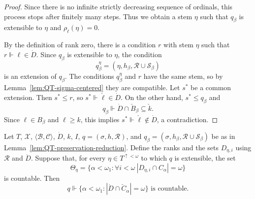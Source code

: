 \begin{proof}
Since there is no infinite strictly decreasing sequence of ordinals, this
process stops after finitely many steps.  Thus we obtain a stem $\eta$ such
that $q_\beta$ is extensible to $\eta$ and $\rho_\ell(\eta)=0$.

By the definition of rank zero, there is a condition $r$ with stem $\eta$ such
that $r\Vdash \ell\in\dot D$.
Since $q_\beta$ is extensible to $\eta$, the condition
\[
  q_\beta^\eta=(\eta,h_\beta,\mathcal R\cup\mathcal S_\beta)
\]
is an extension of $q_\beta$.  The conditions $q_\beta^\eta$ and $r$ have the
same stem, so by Lemma~\ref{lem:QT-sigma-centered} they are compatible.  Let
$s^*$ be a common extension.  Then $s^*\leq r$, so $s^*\Vdash \check \ell\in\dot D$.
On the other hand, $s^*\leq q_\beta$ and
\[
  q_\beta\Vdash \dot D\cap \check B_\beta\subseteq \check k.
\]
Since $\ell\in B_\beta$ and $\ell\geq k$, this implies $s^*\Vdash \check \ell\notin\dot D$, a contradiction.
\end{proof}

\begin{lemma}\label{lem:QT-case-two-forces-finite}
Let $T$, $\mathcal X$, $\langle\mathcal B,\mathcal C\rangle$, $\dot D$,
$k$, $I$, $q=(\sigma,h,\mathcal R)$, and
$q_\beta=(\sigma,h_\beta,\mathcal R\cup\mathcal S_\beta)$ be as in
Lemma~\ref{lem:QT-preservation-reduction}.  Define the ranks and the sets
$D_{\eta,i}$ using $\mathcal R$ and $\dot D$.  Suppose that, for every
$\eta\in T^{\uparrow<\omega}$ to which $q$ is extensible, the set
\[
  \Theta_\eta=
  \{\alpha<\omega_1:
    \forall i<\omega\ |D_{\eta,i}\cap C_\alpha|=\omega\}
\]
is countable.  Then
\[
  q\Vdash \{\alpha<\omega_1:|\dot D\cap \check C_\alpha|=\omega\}\text{ is countable}.
\]
\end{lemma}

